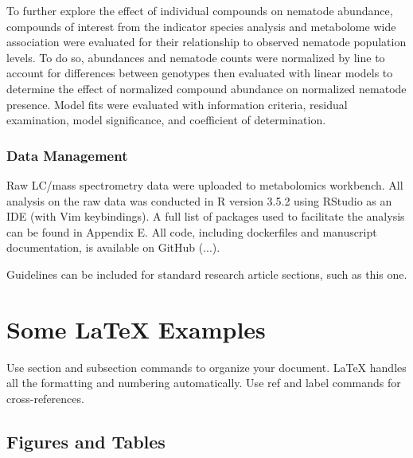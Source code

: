 \documentclass[9pt,lineno]{elife}
\begin{document}
To further explore the effect of individual compounds on nematode abundance, compounds of interest from the indicator species analysis and metabolome wide association were evaluated for their relationship to observed nematode population levels.  To do so, abundances and nematode counts were normalized by line to account for differences between genotypes then evaluated with linear models to determine the effect of normalized compound abundance on normalized nematode presence. Model fits were evaluated with information criteria, residual examination, model significance, and coefficient of determination.  


\subsubsection{Data Management}

Raw LC/mass spectrometry data were uploaded to metabolomics workbench.  All analysis on the raw data was conducted in R version 3.5.2 using RStudio as an IDE (with Vim keybindings).  A full list of packages used to facilitate the analysis can be found in Appendix E.  All code, including dockerfiles and manuscript documentation, is available on GitHub (...).  








Guidelines can be included for standard research article sections, such as this one. 

\lipsum[3]

\section{Some \LaTeX{} Examples}
\label{sec:examples}

Use section and subsection commands to organize your document. \LaTeX{} handles all the formatting and numbering automatically. Use ref and label commands for cross-references.

\subsection{Figures and Tables}
\end{document}
